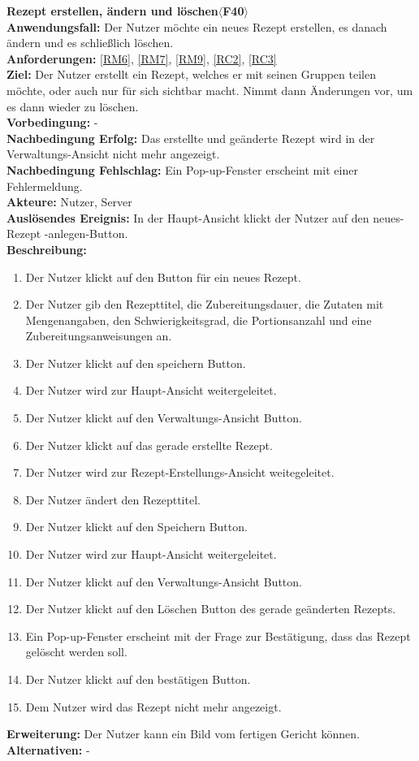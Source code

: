 \documentclass[parskip=full]{scrartcl}
\begin{document}
\textbf{Rezept erstellen, ändern und löschen$\langle$F40$\rangle$}\\
\textbf{Anwendungsfall:} Der Nutzer möchte ein neues Rezept erstellen, es danach ändern und es schließlich löschen.\\
\textbf{Anforderungen:} \ref{RM6}, \ref{RM7}, \ref{RM9}, \ref{RC2}, \ref{RC3}\\
\textbf{Ziel:} Der Nutzer erstellt ein Rezept, welches er mit seinen Gruppen teilen möchte, oder auch nur für sich sichtbar macht. Nimmt dann Änderungen vor, um es dann wieder zu löschen.\\
\textbf{Vorbedingung:} -\\
\textbf{Nachbedingung Erfolg:} Das erstellte und geänderte Rezept wird in der Verwaltungs-Ansicht nicht mehr angezeigt.  \\
\textbf{Nachbedingung Fehlschlag:} Ein Pop-up-Fenster erscheint mit einer Fehlermeldung.\\
\textbf{Akteure:} Nutzer, Server\\
\textbf{Auslösendes Ereignis:} In der Haupt-Ansicht klickt der Nutzer auf den neues-Rezept -anlegen-Button.\\
\textbf{Beschreibung:}
\begin{enumerate}
    \item Der Nutzer klickt auf den Button für ein neues Rezept.
    \item Der Nutzer gib den Rezepttitel, die Zubereitungsdauer, die Zutaten mit Mengenangaben, den Schwierigkeitsgrad, die Portionsanzahl und eine Zubereitungsanweisungen an.
    \item Der Nutzer klickt auf den speichern Button.
    \item Der Nutzer wird zur Haupt-Ansicht weitergeleitet.
    \item Der Nutzer klickt auf den Verwaltungs-Ansicht Button.
    \item Der Nutzer klickt auf das gerade erstellte Rezept.
    \item Der Nutzer wird zur Rezept-Erstellungs-Ansicht weitegeleitet.
    \item Der Nutzer ändert den Rezepttitel.
    \item Der Nutzer klickt auf den Speichern Button.
    \item Der Nutzer wird zur Haupt-Ansicht weitergeleitet.
    \item Der Nutzer klickt auf den Verwaltungs-Ansicht Button.
    \item Der Nutzer klickt auf den Löschen Button des gerade geänderten Rezepts.
    \item Ein Pop-up-Fenster erscheint mit der Frage zur Bestätigung, dass das Rezept gelöscht werden soll.
    \item Der Nutzer klickt auf den bestätigen Button.
    \item Dem Nutzer wird das Rezept nicht mehr angezeigt.
\end{enumerate}
\textbf{Erweiterung:} Der Nutzer kann ein Bild vom fertigen Gericht können.\\
\textbf{Alternativen:} -
\newpage
\end{document}
